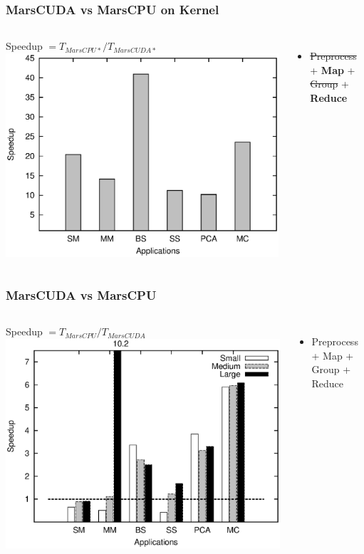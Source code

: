 \begin{frame}
\frametitle{MarsCUDA vs MarsCPU on Kernel}
\begin{columns}
\begin{block}{Speedup $= T_{MarsCPU*} / T_{MarsCUDA*}$}
\includegraphics[width=1.0\textwidth]{figure/kernel.eps}
\end{block}
\begin{itemize}
\item \sout{Preprocess} + \textbf{Map} + \sout{Group} + \textbf{Reduce}
\end{itemize}
\end{columns}
\end{frame}

\begin{frame}
\frametitle{MarsCUDA vs MarsCPU}
\begin{columns}
\begin{block}{Speedup $= T_{MarsCPU} / T_{MarsCUDA}$}
\includegraphics[width=1.0\textwidth]{figure/MarsGPU_MarsCPU.eps}
\end{block}
\begin{itemize}
\item Preprocess + Map + Group + Reduce
\end{itemize}
\end{columns}
\end{frame}

